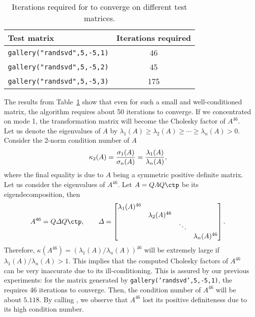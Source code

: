 \begin{table}[H]
\centering
\caption{Iterations required for  to converge on different 
  test matrices.}
\label{table.iter-5by5}
\begin{tabular}{lc} \toprule
  Test matrix & Iterations required \\\midrule
  \texttt{gallery("randsvd",5,-5,1)} & 46 \\
  \texttt{gallery("randsvd",5,-5,2)} & 45 \\
  \texttt{gallery("randsvd",5,-5,3)} & 175 \\
  \bottomrule
\end{tabular}
\end{table}
The results from Table~\ref{table.iter-5by5} show that even for such a
small and well-conditioned matrix, the algorithm requires about 50
iterations to converge.
If we concentrated on mode 1, the transformation matrix will become
the Cholesky factor of $A^{46}$.
Let us denote the eigenvalues of $A$ by
$\lambda_{1}(A) \ge \lambda_{2}(A) \ge \cdots \ge \lambda_{n}(A) > 0$.
Consider the 2-norm condition number of $A$
\begin{equation}\notag
  \kappa_{2}(A) = \frac{\sigma_{1}(A)}{\sigma_{n}(A)}
  = \frac{\lambda_{1}(A)}{\lambda_{n}(A)},
\end{equation}
where the final equality is due to $A$ being a symmetric positive definite 
matrix. 
Let us consider the eigenvalues of $A^{46}$.
Let $A = Q\varLambda Q\ctp$ be its eigendecomposition, then 
\begin{equation}\notag
  A^{46} = Q \varDelta Q\ctp, \qquad
  \varDelta =
  \begin{bmatrix}
    \lambda_{1}(A)^{46} &  &  &  \\
                        & \lambda_{2}(A)^{46} & &  \\
                        & & \ddots & \\
                        & & & \lambda_{n}(A)^{46}
  \end{bmatrix}.
\end{equation}
Therefore, $\kappa(A^{46}) = (\lambda_{1}(A)/\lambda_{n}(A))^{46}$ will be
extremely large if $\lambda_{1}(A)/\lambda_{n}(A) > 1$.
This implies that the computed Cholesky factors of $A^{46}$ can be very
inaccurate due to its ill-conditioning. This is assured by our previous
experiments: for the matrix generated by
\texttt{gallery('randsvd',5,-5,1)}, the  requires 46
iterations to converge.
Then, the condition number of $A^{46}$ will be about $\num{5.1}{18}$.
By calling , we observe that $A^{46}$ lost its positive
definiteness due to its high condition number. 

